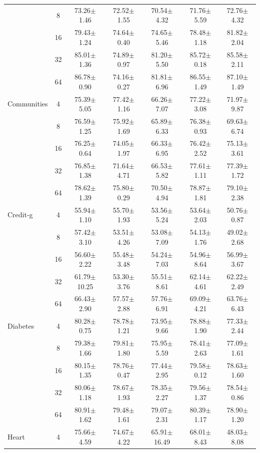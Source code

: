 \documentclass{article}
\theoremstyle{plain}
\theoremstyle{definition}
\theoremstyle{remark}
\begin{document}
\begin{table}[h!]
{\begin{tabular}{@{}lcccccc@{}}
 & 8 & 73.26$\pm$1.46 & 72.52$\pm$1.55 & 70.54$\pm$4.32 & 71.76$\pm$5.59 & 72.76$\pm$4.32 \\
 & 16 & 79.43$\pm$1.24 & 74.64$\pm$0.40 & 74.65$\pm$5.46 & 78.48$\pm$1.18 & 81.82$\pm$2.04 \\
 & 32 & 85.01$\pm$1.36 & 74.89$\pm$0.97 & 81.20$\pm$5.50 & 85.72$\pm$0.18 & 85.58$\pm$2.11 \\
 & 64 & 86.78$\pm$0.90 & 74.16$\pm$0.27 & 81.81$\pm$6.96 & 86.55$\pm$1.49 & 87.10$\pm$1.49 \\ \hline
Communities & 4 & 75.39$\pm$5.05 & 77.42$\pm$1.16 & 66.26$\pm$7.07 & 77.22$\pm$3.08 & 71.97$\pm$9.87 \\
 & 8 & 76.59$\pm$1.25 & 75.92$\pm$1.69 & 65.89$\pm$6.33 & 76.38$\pm$0.93 & 69.63$\pm$6.74 \\
 & 16 & 76.25$\pm$0.64 & 74.05$\pm$1.97 & 66.33$\pm$6.95 & 76.42$\pm$2.52 & 75.13$\pm$3.61 \\
 & 32 & 76.85$\pm$1.38 & 71.64$\pm$4.71 & 66.53$\pm$5.82 & 77.61$\pm$1.11 & 77.39$\pm$1.72 \\
 & 64 & 78.62$\pm$1.39 & 75.80$\pm$0.29 & 70.50$\pm$4.94 & 78.87$\pm$1.81 & 79.10$\pm$2.38 \\ \hline
Credit-g & 4 & 55.94$\pm$1.10 & 55.70$\pm$1.93 & 53.56$\pm$5.24 & 53.64$\pm$2.03 & 50.76$\pm$0.87 \\
 & 8 & 57.42$\pm$3.10 & 53.51$\pm$4.26 & 53.08$\pm$7.09 & 54.13$\pm$1.76 & 49.02$\pm$2.68 \\
 & 16 & 56.60$\pm$2.22 & 55.48$\pm$3.48 & 54.24$\pm$7.03 & 54.96$\pm$8.64 & 56.99$\pm$3.67 \\
 & 32 & 61.79$\pm$10.25 & 53.30$\pm$3.76 & 55.51$\pm$8.61 & 62.14$\pm$4.61 & 62.22$\pm$2.49 \\
 & 64 & 66.43$\pm$2.90 & 57.57$\pm$2.88 & 57.76$\pm$6.91 & 69.09$\pm$4.21 & 63.76$\pm$6.43 \\ \hline
Diabetes & 4 & 80.28$\pm$0.75 & 78.78$\pm$1.21 & 73.95$\pm$9.66 & 78.88$\pm$1.90 & 77.33$\pm$2.44 \\
 & 8 & 79.38$\pm$1.66 & 79.81$\pm$1.80 & 75.95$\pm$5.59 & 78.41$\pm$2.63 & 77.09$\pm$1.61 \\
 & 16 & 80.15$\pm$1.35 & 78.76$\pm$0.47 & 77.44$\pm$2.95 & 79.58$\pm$0.12 & 78.63$\pm$1.60 \\
 & 32 & 80.06$\pm$1.18 & 78.67$\pm$1.93 & 78.35$\pm$2.27 & 79.56$\pm$1.37 & 78.54$\pm$0.86 \\
 & 64 & 80.91$\pm$1.62 & 79.48$\pm$1.61 & 79.07$\pm$2.31 & 80.39$\pm$1.17 & 78.90$\pm$1.20 \\ \hline
Heart & 4 & 75.66$\pm$4.59 & 74.67$\pm$4.22 & 65.91$\pm$16.49 & 68.01$\pm$8.43 & 48.03$\pm$8.08 \\

\end{tabular}}
\end{table}
\end{document}
